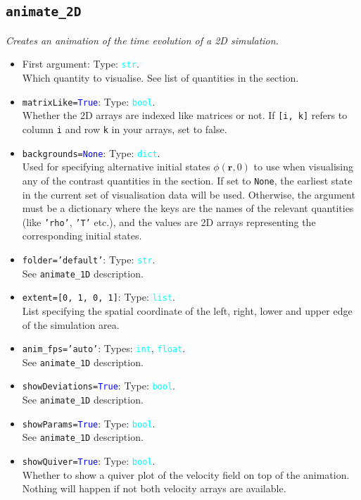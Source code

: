 \documentclass{article}
\newcommand{\ttt}[1]{\texttt{#1}}
\newcommand{\ptype}[1]{\texttt{\textcolor{cyan}{#1}}}
\newcommand{\cbl}[1]{\textcolor{blue}{#1}}
\newcommand{\cro}[1]{\textcolor{RedOrange}{#1}}
\newcommand{\cyo}[1]{\textcolor{YellowOrange}{#1}}
\begin{document}
\subsection{\ttt{animate\_2D}}
\label{sec:anim2}
\textit{Creates an animation of the time evolution of a 2D simulation.}
\begin{itemize}
	\item First argument: Type: \ptype{str}.\\Which quantity to visualise. See list of quantities in the  section.
	\item \ttt{\cro{matrixLike}=\cbl{True}}: Type: \ptype{bool}.\\Whether the 2D arrays are indexed like matrices or not. If \ttt{[i, k]} refers to column \ttt{i} and row \ttt{k} in your arrays, set to false.
	\item \ttt{\cro{backgrounds}=\cbl{None}}: Type: \ptype{dict}.\\Used for specifying alternative initial states $\phi(\mathbf{r}, 0)$ to use when visualising any of the contrast quantities in the  section. If set to \ttt{None}, the earliest state in the current set of visualisation data will be used. Otherwise, the argument must be a dictionary where the keys are the names of the relevant quantities (like \ttt{'rho'}, \ttt{'T'} etc.), and the values are 2D arrays representing the corresponding initial states.
	\item \ttt{\cro{folder}=\cyo{'default'}}: Type: \ptype{str}.\\See \ttt{animate\_1D} description.
	\item \ttt{\cro{extent}=[0, 1, 0, 1]}: Type: \ptype{list}.\\List specifying the spatial coordinate of the left, right, lower and upper edge of the simulation area.
	\item \ttt{\cro{anim\_fps}=\cyo{'auto'}}: Types: \ptype{int}, \ptype{float}.\\See \ttt{animate\_1D} description.
	\item \ttt{\cro{showDeviations}=\cbl{True}}: Type: \ptype{bool}.\\See \ttt{animate\_1D} description.
	\item \ttt{\cro{showParams}=\cbl{True}}: Type: \ptype{bool}.\\See \ttt{animate\_1D} description.
	\item \ttt{\cro{showQuiver}=\cbl{True}}: Type: \ptype{bool}.\\Whether to show a quiver plot of the velocity field on top of the animation. Nothing will happen if not both velocity arrays are available.

\end{itemize}
\end{document}
